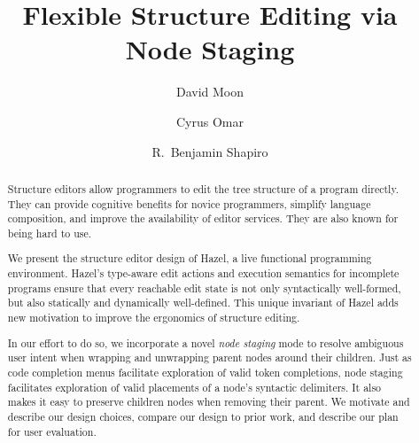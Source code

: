 \documentclass[runningheads]{llncs}
\newcommand{\Hazel}{\textsf{Hazel}\xspace}
\begin{document}
%
\title{Flexible Structure Editing via Node Staging}
%
%
\author{David Moon \and
Cyrus Omar \and
R.~Benjamin Shapiro}
%
%
%
\maketitle              %
%
\begin{abstract}
Structure editors allow programmers to edit the tree structure of a program directly.
They can provide cognitive benefits for novice programmers, simplify language composition, 
and improve the availability of editor services. They are also known for being hard 
to use.

We present the structure editor design of \Hazel, a live functional programming
environment. \Hazel's type-aware edit actions and execution semantics for incomplete programs ensure that every reachable edit state is not only syntactically well-formed, but also statically and dynamically well-defined. This unique invariant of \Hazel adds new motivation to improve the ergonomics of structure editing. 

In our effort to do so, we incorporate a novel \emph{node staging} mode to resolve ambiguous user intent when wrapping and unwrapping parent nodes around their children. Just as code completion menus facilitate exploration of valid token completions, node staging facilitates exploration of valid placements of a node's syntactic delimiters. It also makes it easy to preserve children nodes when removing their parent. We motivate and describe our design choices, compare our design to prior work, and describe our plan for user evaluation.
\end{abstract}
%
%
%
\end{document}
